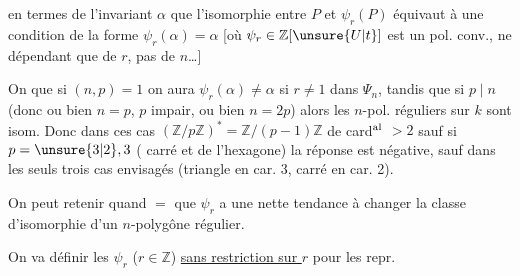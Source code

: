 en termes de l'invariant $\alpha$ que  l'isomorphie entre $P$ et $\psi_r(P)$ équivaut à une condition de la forme $\psi_r(\alpha)=\alpha$ [où $\psi_r\in\mathbb Z[\unsure{U|t}]$ est un pol. conv., \deleted{\unsure{\}}} ne dépendant que de $r$, pas de $n$\ldots]

On  que  si $(n,p)=1$ on aura $\psi_r(\alpha)\neq\alpha$ si $r\neq1$ dans $\Psi_n$, tandis que si  $p\mid n$ (donc ou bien $n=p$, $p$ impair, ou bien $n=2p$) alors  les $n$-pol. réguliers sur $k$ sont isom.  Donc dans ces cas   $(\mathbb Z/p\mathbb Z)^*=\mathbb Z/(p-1)\mathbb Z$ de card$^{\rm al}$  $>2$  sauf si $p=\unsure{3|2},3$ (   carré et de l'hexagone) la réponse est négative, sauf dans les seuls  trois cas envisagés (triangle  en car. 3, carré en car. 2).

On peut retenir quand $=$ que $\psi_r$ a une nette tendance à changer la classe d'isomorphie d'un $n$-polygône régulier.

On va  définir les $\psi_r$ ($r\in\mathbb Z$) \uline{sans restriction sur $r$} pour les repr.
